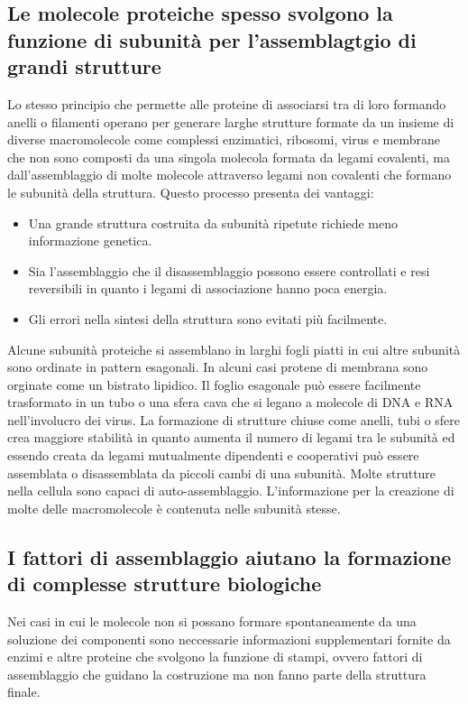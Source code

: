 \subsection{Le molecole proteiche spesso svolgono la funzione di subunit\`a per l'assemblagtgio di grandi strutture}
Lo stesso principio che permette alle proteine di associarsi tra di loro formando anelli o filamenti operano per generare larghe strutture formate da un insieme di diverse macromolecole
come complessi enzimatici, ribosomi, virus e membrane che non sono composti da una singola molecola formata da legami covalenti, ma dall'assemblaggio di molte molecole attraverso legami
non covalenti che formano le subunit\`a della struttura. Questo processo presenta dei vantaggi:
\begin{itemize}
	\item Una grande struttura costruita da subunit\`a ripetute richiede meno informazione genetica.
	\item Sia l'assemblaggio che il disassemblaggio possono essere controllati e resi reversibili in quanto i legami di associazione hanno poca energia.
	\item Gli errori nella sintesi della struttura sono evitati pi\`u facilmente. 
\end{itemize}
Alcune subunit\`a proteiche si assemblano in larghi fogli piatti in cui altre subunit\`a sono ordinate in pattern esagonali. In alcuni casi protene di membrana sono orginate come un
bistrato lipidico. Il foglio esagonale pu\`o essere facilmente trasformato in un tubo o una sfera cava che si legano a molecole di DNA e RNA nell'involucro dei virus. La formazione
di strutture chiuse come anelli, tubi o sfere crea maggiore stabilit\`a in quanto aumenta il numero di legami tra le subunit\`a ed essendo creata da legami mutualmente dipendenti e 
cooperativi pu\`o essere assemblata o disassemblata da piccoli cambi di una subunit\`a. Molte strutture nella cellula sono capaci di auto-assemblaggio. L'informazione per la creazione di
molte delle macromolecole \`e contenuta nelle subunit\`a stesse. 
\subsection{I fattori di assemblaggio aiutano la formazione di complesse strutture biologiche}
Nei casi in cui le molecole non si possano formare spontaneamente da una soluzione dei componenti sono neccessarie informazioni supplementari fornite da enzimi e altre proteine che 
svolgono la funzione di stampi, ovvero fattori di assemblaggio che guidano la costruzione ma non fanno parte della struttura finale. 

